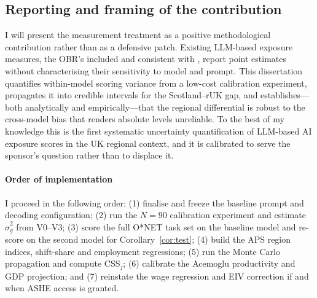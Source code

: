 \subsection{Reporting and framing of the contribution}

I will present the measurement treatment as a positive methodological contribution rather than as a defensive patch. Existing LLM-based exposure measures, the OBR's \citep{obr2025} included and consistent with \citet{eloundou2024gpts}, report point estimates without characterising their sensitivity to model and prompt. This dissertation quantifies within-model scoring variance from a low-cost calibration experiment, propagates it into credible intervals for the Scotland--rUK gap, and establishes---both analytically and empirically---that the regional differential is robust to the cross-model bias that renders absolute levels unreliable. To the best of my knowledge this is the first systematic uncertainty quantification of LLM-based AI exposure scores in the UK regional context, and it is calibrated to serve the sponsor's question rather than to displace it.

\paragraph{Order of implementation} I proceed in the following order: (1) finalise and freeze the baseline prompt and decoding configuration; (2) run the $N=90$ calibration experiment and estimate $\hat\sigma^2_g$ from V0--V3; (3) score the full O*NET task set on the baseline model and re-score on the second model for Corollary~\ref{cor:test}; (4) build the APS region indices, shift-share and employment regressions; (5) run the Monte Carlo propagation and compute CSS$_j$; (6) calibrate the Acemoglu productivity and GDP projection; and (7) reinstate the wage regression and EIV correction if and when ASHE access is granted.




